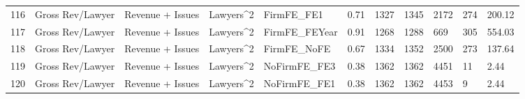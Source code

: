 \documentclass{article}
\begin{document}
\begin{table}[H]
\begin{tabular}{rllllllllll}
  116 & Gross Rev/Lawyer & Revenue + Issues & Lawyers^2 & FirmFE\_FE1 & 0.71 & 1327 & 1345 & 2172 & 274 & 200.12 \\ 
  117 & Gross Rev/Lawyer & Revenue + Issues & Lawyers^2 & FirmFE\_FEYear & 0.91 & 1268 & 1288 & 669 & 305 & 554.03 \\ 
  118 & Gross Rev/Lawyer & Revenue + Issues & Lawyers^2 & FirmFE\_NoFE & 0.67 & 1334 & 1352 & 2500 & 273 & 137.64 \\ 
  119 & Gross Rev/Lawyer & Revenue + Issues & Lawyers^2 & NoFirmFE\_FE3 & 0.38 & 1362 & 1362 & 4451 & 11 & 2.44 \\ 
  120 & Gross Rev/Lawyer & Revenue + Issues & Lawyers^2 & NoFirmFE\_FE1 & 0.38 & 1362 & 1362 & 4453 & 9 & 2.44 \\ 
   \hline
\end{tabular}
\end{table}
\end{document}
